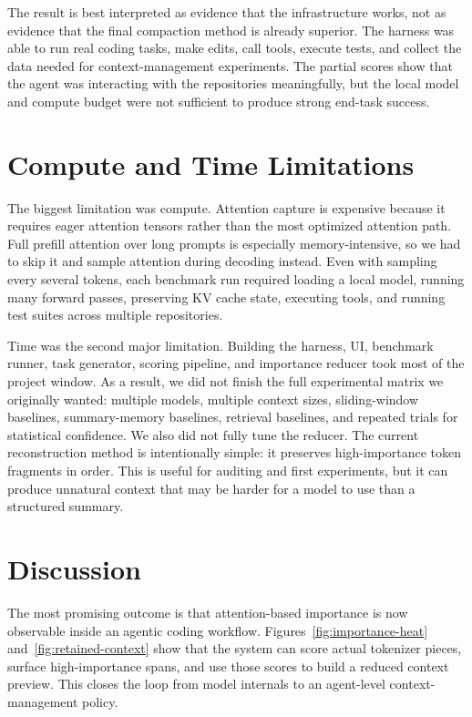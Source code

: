\documentclass[11pt]{article}
\begin{document}
The result is best interpreted as evidence that the infrastructure works, not as
evidence that the final compaction method is already superior. The harness was
able to run real coding tasks, make edits, call tools, execute tests, and collect
the data needed for context-management experiments. The partial scores show that
the agent was interacting with the repositories meaningfully, but the local model
and compute budget were not sufficient to produce strong end-task success.

\section*{Compute and Time Limitations}

The biggest limitation was compute. Attention capture is expensive because it
requires eager attention tensors rather than the most optimized attention path.
Full prefill attention over long prompts is especially memory-intensive, so we
had to skip it and sample attention during decoding instead. Even with sampling
every several tokens, each benchmark run required loading a local model, running
many forward passes, preserving KV cache state, executing tools, and running test
suites across multiple repositories.

Time was the second major limitation. Building the harness, UI, benchmark
runner, task generator, scoring pipeline, and importance reducer took most of
the project window. As a result, we did not finish the full experimental matrix
we originally wanted: multiple models, multiple context sizes, sliding-window
baselines, summary-memory baselines, retrieval baselines, and repeated trials for
statistical confidence. We also did not fully tune the reducer. The current
reconstruction method is intentionally simple: it preserves high-importance
token fragments in order. This is useful for auditing and first experiments, but
it can produce unnatural context that may be harder for a model to use than a
structured summary.

\section*{Discussion}

The most promising outcome is that attention-based importance is now observable
inside an agentic coding workflow. Figures~\ref{fig:importance-heat}
and~\ref{fig:retained-context} show that the system can score actual tokenizer
pieces, surface high-importance spans, and use those scores to build a reduced
context preview. This closes the loop from model internals to an agent-level
context-management policy.
\end{document}
